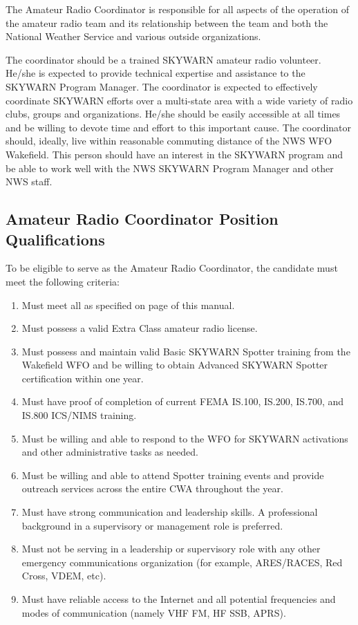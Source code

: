 \documentclass[pdflatex,letterpaper,twoside,12pt]{book}
\begin{document}
The Amateur Radio Coordinator is responsible for all aspects of the operation of the amateur radio team and its relationship between the team and both the National Weather Service and various outside organizations.

The coordinator should be a trained SKYWARN amateur radio volunteer.  He/she is expected to provide technical expertise and assistance to the SKYWARN Program Manager.  The coordinator is expected to effectively coordinate SKYWARN efforts over a multi-state area with a wide variety of radio clubs, groups and organizations.  He/she should be easily accessible at all times and be willing to devote time and effort to this important cause.  The coordinator should, ideally, live within reasonable commuting distance of the NWS WFO Wakefield.  This person should have an interest in the SKYWARN program and be able to work well with the NWS SKYWARN Program Manager and other NWS staff. 

\subsection{Amateur Radio Coordinator Position Qualifications}

To be eligible to serve as the Amateur Radio Coordinator, the candidate must meet the following criteria:

\begin{enumerate}
\item Must meet all  as specified on page \pageref{nco-criteria} of this manual.
\item Must possess a valid Extra Class amateur radio license.
\item Must possess and maintain valid Basic SKYWARN Spotter training from the Wakefield WFO and be willing to obtain Advanced SKYWARN Spotter certification within one year.
\item Must have proof of completion of current FEMA IS.100, IS.200, IS.700, and IS.800 ICS/NIMS training.
\item Must be willing and able to respond to the WFO for SKYWARN activations and other administrative tasks as needed.
\item Must be willing and able to attend Spotter training events and provide outreach services across the entire CWA throughout the year.
\item Must have strong communication and leadership skills.  A professional background in a supervisory or management role is preferred.
\item Must not be serving in a leadership or supervisory role with any other emergency communications organization (for example, ARES/RACES, Red Cross, VDEM, etc).
\item Must have reliable access to the Internet and all potential frequencies and modes of communication (namely VHF FM, HF SSB, APRS).
\end{enumerate}
\end{document}
